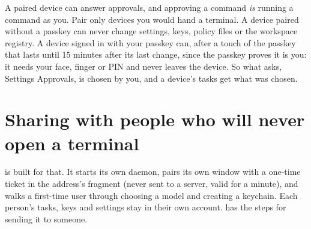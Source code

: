 \begin{careful}
A paired device can answer approvals, and approving a command \emph{is}
running a command as you. Pair only devices you would hand a terminal. A
device paired without a passkey can never change settings, keys, policy
files or the workspace registry. A device signed in with your passkey can,
after a touch of the passkey that lasts until 15 minutes after its last
change, since the passkey proves it is you: it needs your face, finger or
PIN and never leaves the device. So what asks, Settings
\textrightarrow{} Approvals, is chosen by you, and a device's tasks get
what was chosen.
\end{careful}

\section{Sharing with people who will never open a terminal}

 is built for that. It starts its own daemon, pairs its own
window with a one-time ticket in the address's fragment (never sent to a
server, valid for a minute), and walks a first-time user through choosing a
model and creating a keychain. Each person's tasks, keys and settings stay
in their own account.  has the steps for sending it to
someone.

